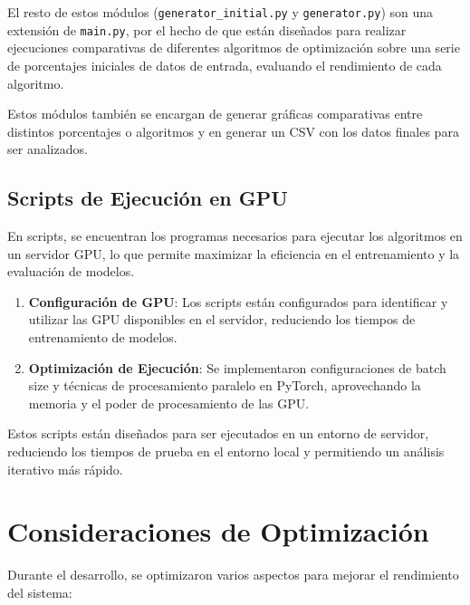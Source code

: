 El resto de estos módulos (\texttt{generator\_initial.py} y \texttt{generator.py}) son una extensión de
\texttt{main.py}, por el hecho de que están diseñados para realizar ejecuciones comparativas de diferentes algoritmos
de optimización sobre una serie de porcentajes iniciales de datos de entrada, evaluando el rendimiento de cada
algoritmo.


Estos módulos también se encargan de generar gráficas comparativas entre distintos porcentajes o algoritmos y en
generar un CSV con los datos finales para ser analizados.

\subsection{Scripts de Ejecución en GPU}\label{subsec:scripts-de-ejecucion-en-gpu}
En scripts, se encuentran los programas necesarios para ejecutar los algoritmos en un servidor GPU, lo que permite
maximizar la eficiencia en el entrenamiento y la evaluación de modelos.
\begin{enumerate}
      \item \textbf{Configuración de GPU}: Los scripts están configurados para identificar y utilizar las GPU disponibles
            en el servidor, reduciendo los tiempos de entrenamiento de modelos.
      \item \textbf{Optimización de Ejecución}: Se implementaron configuraciones de batch size y técnicas de
            procesamiento paralelo en PyTorch, aprovechando la memoria y el poder de procesamiento de las GPU\@.
\end{enumerate}

Estos scripts están diseñados para ser ejecutados en un entorno de servidor, reduciendo los tiempos de prueba en el
entorno local y permitiendo un análisis iterativo más rápido.

\section{Consideraciones de Optimización}\label{sec:consideraciones-de-optimizacion}
Durante el desarrollo, se optimizaron varios aspectos para mejorar el rendimiento del sistema:

